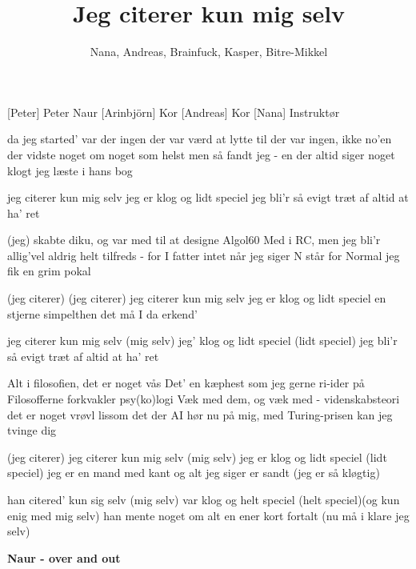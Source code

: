 \documentclass[a4paper,11pt]{article}
\title{Jeg citerer kun mig selv}
\author{Nana, Andreas, Brainfuck, Kasper, Bitre-Mikkel}
\begin{document}
\maketitle

\begin{roles}
[Peter] Peter Naur
[Arinbjörn] Kor
[Andreas] Kor
[Nana] Instruktør
\end{roles}

\begin{song}
%
da jeg started'
var der ingen der var værd at lytte til
der var ingen, ikke no’en der vidste noget om noget som helst
men så fandt jeg - en der altid siger noget klogt
jeg læste i hans bog

jeg citerer kun mig selv
jeg er klog og lidt speciel
jeg bli’r så evigt træt
af altid at ha’ ret

(jeg) skabte diku, og var med til at designe Algol60
Med i RC, men jeg bli’r allig’vel aldrig helt tilfreds -
for I fatter intet når jeg
siger N står for Normal
jeg fik en grim pokal

(jeg citerer)
(jeg citerer)
jeg citerer kun mig selv
jeg er klog og lidt speciel
en stjerne simpelthen
det må I da erkend’

jeg citerer kun mig selv (mig selv)
jeg’ klog og lidt speciel (lidt speciel)
jeg bli’r så evigt træt
af altid at ha’ ret

Alt i filosofien, det er noget vås
Det’ en kæphest som jeg gerne ri-ider på
Filosofferne forkvakler psy(ko)logi
Væk med dem, og væk med - videnskabsteori
det er noget vrøvl lissom det der AI
hør nu på mig, med Turing-prisen kan jeg tvinge dig

(jeg citerer)
jeg citerer kun mig selv (mig selv)
jeg er klog og lidt speciel (lidt speciel)
jeg er en mand med kant
og alt jeg siger er sandt (jeg er så kløgtig)

han citered' kun sig selv (mig selv)
var klog og helt speciel (helt speciel)(og kun enig med mig selv)
han mente noget om alt
en ener kort fortalt (nu må i klare jeg selv)

\textbf{Naur - over and out}

\end{song}
\end{document}
